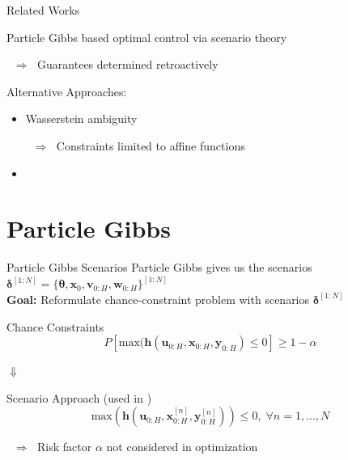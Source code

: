 \documentclass[student, noshadow, itr, english, aspectratio=169]{ITR_LSR_slides}
\begin{document}
\begin{frame}{Related Works}

Particle Gibbs based optimal control via scenario theory \textbf{\cite[4]{Robert_24}}

$\;\; \Rightarrow \;$ Guarantees determined retroactively

\vspace{.4cm}

Alternative Approaches:
\begin{itemize}
\item Wasserstein ambiguity \cite[4]{Hota_19}

$\;\; \Rightarrow \;$ Constraints limited to affine functions
\item {} \textbf{\cite[4]{Yassine_22}}\\
\makebox[3cm]{\hfill}   \cite[4]{Adam_22} 
\end{itemize}
\end{frame}


\section{Particle Gibbs}

\begin{frame}{Particle Gibbs Scenarios}
Particle Gibbs gives us the scenarios $\boldsymbol{\delta}^{[1:N]} = \{ \boldsymbol{\theta}, \boldsymbol{x}_0, \boldsymbol{v}_{0:H}, \boldsymbol{w}_{0:H}\}^{[1:N]}$\\

\textbf{Goal:} Reformulate chance-constraint problem with scenarios $\boldsymbol{\delta}^{[1:N]}$

\begin{block}{Chance Constraints}
	\begin{equation*}
		P \left[  \text{max}(\boldsymbol{h}(\boldsymbol{u}_{0:H},  \boldsymbol{x}_{0:H},  \boldsymbol{y}_{0:H}) \leq 0 \right] \geq 1 - \alpha
	\end{equation*}
\end{block}	

\makebox[6.7cm]{\hfill} $\boldsymbol{\Downarrow}$ 

\begin{block}{Scenario Approach (used in \cite{Robert_24})}
	\begin{equation*}
		 \text{max}(\boldsymbol{h}(\boldsymbol{u}_{0:H},  \boldsymbol{x}_{0:H}^{[n]},  \boldsymbol{y}_{0:H}^{[n]})) \leq 0, \; \forall n = 1, ..., N
	\end{equation*}
\end{block}

$\;\; \Rightarrow \;$ Risk factor $\alpha$ not considered in optimization




\end{frame}
\end{document}
